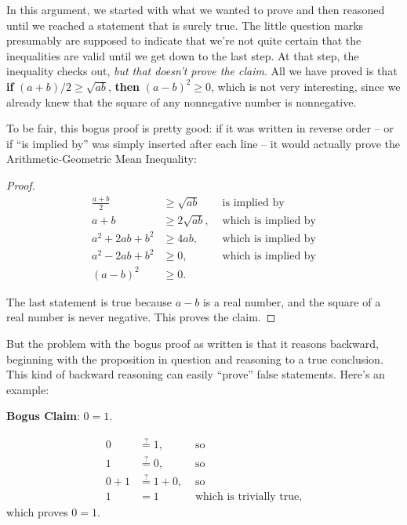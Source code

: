 \documentclass[handout]{mcs}
\begin{document}
\begin{solution}
In this argument, we started with what we wanted to prove and
then reasoned until we reached a statement that is surely true.  The
little question marks presumably are supposed to indicate that we're not
quite certain that the inequalities are valid until we get down to the
last step.  At that step, the inequality checks out, \emph{but that
doesn't prove the claim}.  All we have proved is that \textbf{if} $(a + b)/2
\geq \sqrt{a b}$, \textbf{then} $(a - b)^2 \geq 0$, which is not very
interesting, since we already knew that the square of any nonnegative
number is nonnegative.

To be fair, this bogus proof is pretty good: if it was written in reverse
order -- or if ``is implied by'' was simply inserted after each line -- it
would actually prove the Arithmetic-Geometric Mean Inequality:

\begin{proof}

\begin{align*}
\frac{a + b}{2} & \geq \sqrt{a b} & \text{ is implied by}\\
a + b  & \geq 2 \sqrt{a b},  & \text{ which is implied by}\\
a^2 + 2 a b + b^2  & \geq 4 a b, & \text{ which is implied by}\\
a^2 - 2 a b + b^2  & \geq 0, & \text{ which is implied by}\\
(a - b)^2  & \geq 0.
\end{align*}

The last statement is true because $a - b$ is a real number, and the
square of a real number is never negative.  This proves the claim.
\end{proof}

But the problem with the bogus proof as written is that it reasons
backward, beginning with the proposition in question and reasoning to a
true conclusion.  This kind of backward reasoning can easily ``prove''
false statements.  Here's an example:

\textbf{Bogus Claim}: $0 = 1$.
\begin{bogusproof}
\begin{align*}
0 & \stackrel{?}{=} 1, & \text{ so} \\
1 & \stackrel{?}{=} 0, & \text{ so} \\
0+1 & \stackrel{?}{=} 1+0, & \text{ so} \\
1 & = 1 & \text{ which is trivially true,}
\end{align*}
which proves $0=1$.
\end{bogusproof}


\end{solution}
\end{document}
